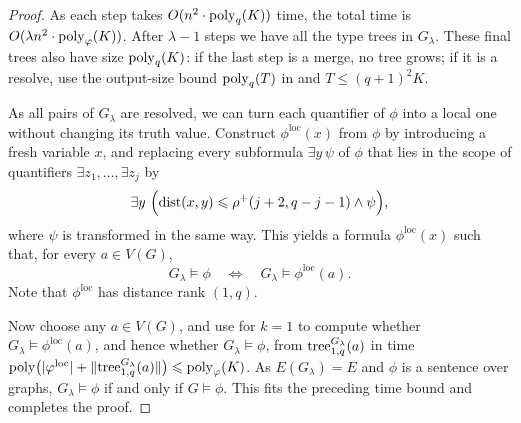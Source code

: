 \begin{proof}
As each step takes $O(n^2\cdot\mathrm{poly}_q(K))$ time, the total time is $O(\lambda n^2\cdot\mathrm{poly}_\varphi(K))$.
After $\lambda-1$ steps we have all the type trees in $G_\lambda$.
These final trees also have size $\mathrm{poly}_q(K)$: if the last step is a merge, no tree grows; if it is a resolve, use the output-size bound $\mathrm{poly}_q(T)$ in  and $T\le(q+1)^2K$.

As all pairs of $G_\lambda$ are resolved,
we can turn each quantifier of $\phi$ into a local one without changing its truth value.
Construct \(\phi^{\mathrm{loc}}(x)\) from \(\phi\) by
introducing a fresh variable $x$, and replacing every subformula
$\exists y\,\psi$ of $\phi$ that lies in the scope of quantifiers
$\exists z_1,\ldots,\exists z_j$ by
\[
\exists y~\Bigl(
\mathrm{dist}(x,y)\leqslant\rho^+(j+2,q-j-1)
\land\psi
\Bigr),
\]
where $\psi$ is transformed in the same way.  This yields a \distFO formula
$\phi^{\mathrm{loc}}(x)$ such that, for
every $a\in V(G)$,
\[
G_\lambda\models\phi
\quad\Longleftrightarrow\quad
G_\lambda\models\phi^{\mathrm{loc}}(a).
\]
Note that $\phi^{\mathrm{loc}}$ has distance rank $(1,q)$.

Now choose any $a\in V(G)$,
and use  for $k=1$ to compute whether $G_\lambda\models\phi^{\mathrm{loc}}(a)$,
and hence whether $G_\lambda\models\phi$, from
$\mathrm{tree}^{G_\lambda}_{1,q}(a)$ in time
$\mathrm{poly}\bigl(|\varphi^{\mathrm{loc}}|+\lVert \mathrm{tree}^{G_\lambda}_{1,q}(a)\rVert\bigr)\leqslant\mathrm{poly}_\varphi(K)$.
As $E(G_\lambda)=E$ and $\phi$ is a sentence over graphs, $G_\lambda\models\phi$ if and only if $G\models\phi$.
This fits the preceding time bound and completes the proof.
\end{proof}

